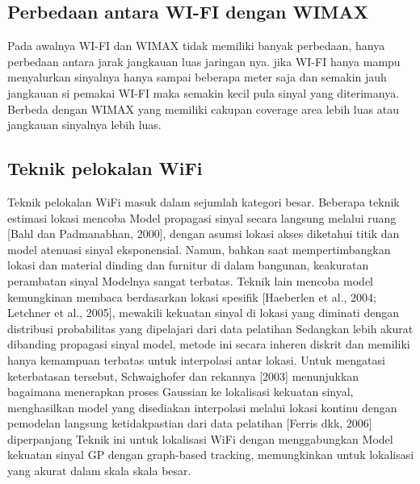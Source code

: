 \subsection {Perbedaan antara WI-FI dengan WIMAX}

Pada awalnya WI-FI dan WIMAX tidak memiliki banyak perbedaan, hanya perbedaan antara jarak jangkauan luas jaringan nya.
jika WI-FI hanya mampu menyalurkan sinyalnya hanya sampai beberapa meter saja dan semakin jauh jangkauan si pemakai WI-FI maka
semakin kecil pula sinyal yang diterimanya. Berbeda dengan WIMAX yang memiliki cakupan coverage area lebih luas atau jangkauan 
sinyalnya lebih luas.

\subsection{Teknik pelokalan WiFi}

Teknik pelokalan WiFi masuk dalam sejumlah kategori besar. Beberapa teknik estimasi lokasi mencoba Model propagasi sinyal secara 
langsung melalui ruang [Bahl dan Padmanabhan, 2000], dengan asumsi lokasi akses diketahui titik dan model atenuasi sinyal eksponensial. 
Namun, bahkan saat mempertimbangkan lokasi dan material dinding dan furnitur di dalam bangunan, keakuratan perambatan sinyal Modelnya 
sangat terbatas. Teknik lain mencoba model kemungkinan membaca berdasarkan lokasi spesifik [Haeberlen et al., 2004; Letchner et al., 
2005], mewakili kekuatan sinyal di lokasi yang diminati dengan distribusi probabilitas yang dipelajari dari data pelatihan Sedangkan 
lebih akurat dibanding propagasi sinyal model, metode ini secara inheren diskrit dan memiliki hanya kemampuan terbatas untuk interpolasi 
antar lokasi. Untuk mengatasi keterbatasan tersebut, Schwaighofer dan rekannya [2003] menunjukkan bagaimana menerapkan proses Gaussian 
ke lokalisasi kekuatan sinyal, menghasilkan model yang disediakan interpolasi melalui lokasi kontinu dengan pemodelan langsung
ketidakpastian dari data pelatihan [Ferris dkk, 2006] diperpanjang Teknik ini untuk lokalisasi WiFi dengan menggabungkan Model kekuatan 
sinyal GP dengan graph-based tracking, memungkinkan untuk lokalisasi yang akurat dalam skala skala besar.


